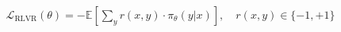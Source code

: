 \documentclass[preview]{standalone}
\begin{document}
\begin{align*}
\mathcal{L}_{\mathrm{RLVR}}(\theta) = -\mathbb{E}\left[\sum_{y} r(x, y)\cdot\pi_{\theta}(y|x)\right] , \quad r(x,y) \in \{-1, +1\}
\end{align*}
\end{document}
